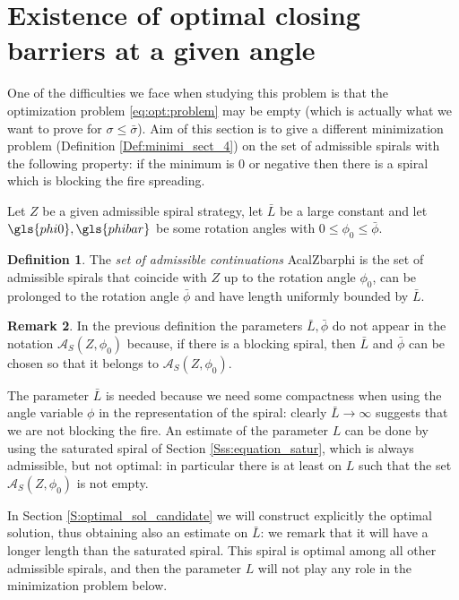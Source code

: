 \documentclass[reqno]{amsart}
\theoremstyle{definition} \newtheorem{definition}{Definition}[section]
\theoremstyle{definition} \newtheorem{remark}[definition]{Remark}
\theoremstyle{plain} \newtheorem{lemma}[definition]{Lemma}
\theoremstyle{plain} \newtheorem{proposition}[definition]{Proposition}
\theoremstyle{plain} \newtheorem{theorem}[definition]{Theorem}
\theoremstyle{plain} \newtheorem{corollary}[definition]{Corollary}
\theoremstyle{definition} \newtheorem{example}[definition]{Example}
\theoremstyle{plain} \newtheorem{claim}[clai]{Claim}
\theoremstyle{definition} \newtheorem{assumption}[definition]{Assumption}
\theoremstyle{definition} \newtheorem{observation}[definition]{Observation}
\newcommand{\1}{\mathbbm 1}
\numberwithin{equation}{section} %
\theoremstyle{plain} \newtheorem*{theorem*}{Theorem}
\theoremstyle{plain} \newtheorem{mthm}[maintheorem]{Main Theorem}
\theoremstyle{plain} \newtheorem*{mthm*}{Main Theorem}
\theoremstyle{plain} \newtheorem*{conjecture*}{Conjecture}
\theoremstyle{plain} \newtheorem{conjecture}[definition]{Conjecture}
\theoremstyle{plain} \newtheorem*{problem*}{Problem}
\begin{document}
\section{Existence of optimal closing barriers at a given angle}
\label{S:exist_opti_traj}


One of the difficulties we face when studying this problem is that the optimization problem \eqref{eq:opt:problem} may be empty (which is actually what we want to prove for $\sigma \leq \bar \sigma$). Aim of this section is to give a different minimization problem (Definition \ref{Def:minimi_sect_4}) on the set of admissible spirals with the following property: if the minimum is $0$ or negative then there is a spiral which is blocking the fire spreading.

Let $Z$ be a given admissible spiral strategy, let $\bar L$ be a large constant and let  $\gls{phi0},\gls{phibar}$ be some rotation angles with $0 \leq {\phi_0} \leq {\bar \phi}$.

\begin{definition}
\label{Def:continuation_spirals}
The \emph{set of admissible continuations}  \gls{AcalZbarphi} is the set of admissible spirals that coincide with $Z$ up to the rotation angle ${\phi_0}$, can be prolonged to the rotation angle ${\bar \phi}$ and have length uniformly bounded by $\bar L$.
\end{definition}

\begin{remark}
\label{Rem:not_appearance_bar_L}
In the previous definition the parameters $\bar L,{\bar \phi}$ do not appear in the notation $\mathcal A_S(Z,{\phi_0})$ because, if there is a blocking spiral, then $\bar L$ and ${\bar \phi}$ can be chosen so that it belongs to $\mathcal A_S(Z,{\phi_0})$.

The parameter $\bar L$ is needed because we need some compactness when using the angle variable $\phi$ in the representation of the spiral: clearly $\bar L \to \infty$ suggests that we are not blocking the fire. An estimate of the parameter $L$ can be done by using the saturated spiral of Section \ref{Sss:equation_satur}, which is always admissible, but not optimal: in particular there is at least on $L$ such that the set $\mathcal A_S(Z,\phi_0)$ is not empty.

In Section \ref{S:optimal_sol_candidate} we will construct explicitly the optimal solution, thus obtaining also an estimate on $\bar L$: we remark that it will have a longer length than the saturated spiral. This spiral is optimal among all other admissible spirals, and then the parameter $L$ will not play any role in the minimization problem below.
\end{remark}
\end{document}
